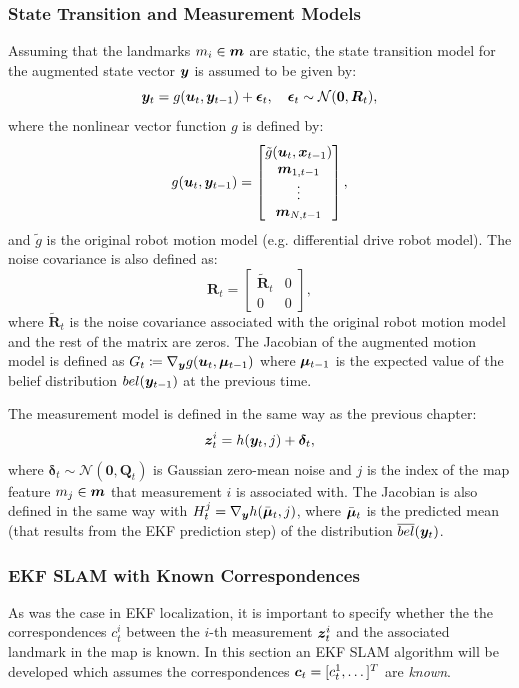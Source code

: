 \subsubsection{State Transition and Measurement Models}
Assuming that the landmarks $m_i \in \bm{m}$ are static, the state transition model for the augmented state vector $\bm{y}$ is assumed to be given by:
\begin{equation*}
    \bm{y}_t = g(\bm{u}_t, \bm{y}_{t-1}) + \bm{\epsilon}_t, \quad \bm{\epsilon}_t \sim \mathcal{N}(\bm{0},\bm{R}_t),
\end{equation*}
where the nonlinear vector function $g$ is defined by:
\begin{equation*}
g(\bm{u}_t, \bm{y}_{t-1}) = \begin{bmatrix}
\tilde{g}(\bm{u}_t, \bm{x}_{t-1}) \\ \bm{m}_{1,t-1} \\ \vdots \\ \bm{m}_{N,t-1}
\end{bmatrix},
\end{equation*}
and $\tilde{g}$ is the original robot motion model (e.g. differential drive robot model). The noise covariance is also defined as:
\begin{equation*}
\bm{R}_t = \begin{bmatrix}
\tilde{\bm{R}}_t & 0 \\
0 & 0
\end{bmatrix},
\end{equation*}
where $\tilde{\bm{R}}_t$ is the noise covariance associated with the original robot motion model and the rest of the matrix are zeros.
The Jacobian of the augmented motion model is defined as $G_t \coloneqq \nabla_{\bm{y}} g(\bm{u}_t, \bm{\mu}_{t-1})$ where $\bm{\mu}_{t-1}$ is the expected value of the belief distribution $bel(\bm{y}_{t-1})$ at the previous time.

The measurement model is defined in the same way as the previous chapter:
\begin{equation*}
\bm{z}^i_t = h(\bm{y}_t, j) + \bm{\delta}_t,
\end{equation*}
where $\bm{\delta}_t \sim \mathcal{N}(\bm{0}, \bm{Q}_t)$ is Gaussian zero-mean noise and $j$ is the index of the map feature $m_j \in \bm{m}$ that measurement $i$ is associated with. The Jacobian is also defined in the same way with $H^{j}_t = \nabla_{\bm{y}}h(\bar{\bm{\mu}}_t,j)$, where $\bar{\bm{\mu}}_t$ is the predicted mean (that results from the EKF prediction step) of the distribution $\overline{bel}(\bm{y}_t)$.

\subsubsection{EKF SLAM with Known Correspondences}
As was the case in EKF localization, it is important to specify whether the the correspondences $c_t^i$ between the $i$-th measurement $\bm{z}_t^i$ and the associated landmark in the map is known. In this section an EKF SLAM algorithm will be developed which assumes the correspondences $\bm{c}_t = [c_t^1, \dots ]^T$ are \textit{known}. 



